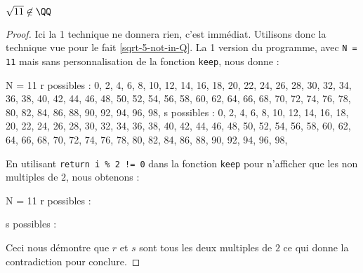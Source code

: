 \begin{fact}
	$\sqrt{11} \not\in \QQ$
\end{fact}

\begin{proof}
	Ici la 1\iere{} technique ne donnera rien, c'est immédiat.
	Utilisons donc la technique vue pour le fait \ref{sqrt-5-not-in-Q}. La 1\iere{} version du programme, avec \verb+N = 11+ mais sans personnalisation de la fonction \verb+keep+, nous donne :

	\begin{rawcode}
N = 11
r possibles :
0, 2, 4, 6, 8, 10, 12, 14, 16, 18, 20, 22, 24, 26, 28, 30, 32, 34, 36, 38, 40, 
42, 44, 46, 48, 50, 52, 54, 56, 58, 60, 62, 64, 66, 68, 70, 72, 74, 76, 78, 80, 
82, 84, 86, 88, 90, 92, 94, 96, 98,
s possibles :
0, 2, 4, 6, 8, 10, 12, 14, 16, 18, 20, 22, 24, 26, 28, 30, 32, 34, 36, 38, 40, 
42, 44, 46, 48, 50, 52, 54, 56, 58, 60, 62, 64, 66, 68, 70, 72, 74, 76, 78, 80, 
82, 84, 86, 88, 90, 92, 94, 96, 98,
	\end{rawcode}
	
	En utilisant \verb+return i % 2 != 0+
	dans la fonction \verb+keep+ pour n'afficher que les non multiples de $2$, nous obtenons :

	\begin{rawcode}
N = 11
r possibles :

s possibles :

	\end{rawcode}
	
	Ceci nous démontre que $r$ et $s$ sont tous les deux multiples de $2$ ce qui donne la contradiction pour conclure. 
\end{proof}